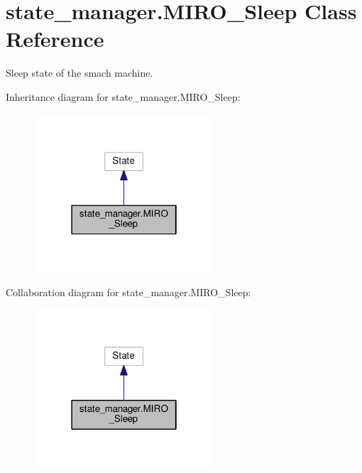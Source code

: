 \hypertarget{classstate__manager_1_1MIRO__Sleep}{}\section{state\+\_\+manager.\+M\+I\+R\+O\+\_\+\+Sleep Class Reference}
\label{classstate__manager_1_1MIRO__Sleep}


Sleep state of the smach machine.  




Inheritance diagram for state\+\_\+manager.\+M\+I\+R\+O\+\_\+\+Sleep\+:
\nopagebreak
\begin{figure}[H]
\begin{center}
\leavevmode
\includegraphics[width=190pt]{classstate__manager_1_1MIRO__Sleep__inherit__graph}
\end{center}
\end{figure}


Collaboration diagram for state\+\_\+manager.\+M\+I\+R\+O\+\_\+\+Sleep\+:
\nopagebreak
\begin{figure}[H]
\begin{center}
\leavevmode
\includegraphics[width=190pt]{classstate__manager_1_1MIRO__Sleep__coll__graph}
\end{center}
\end{figure}
